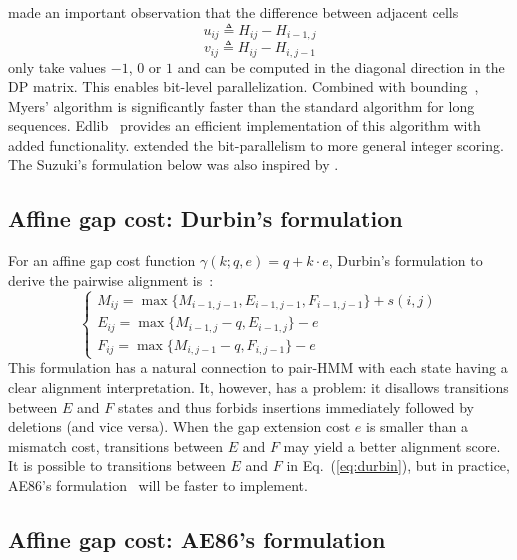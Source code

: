 \documentclass{bioinfo}
\begin{document}
\citet{Myers:1999aa} made an important observation that the difference between
adjacent cells
\[u_{ij}\triangleq H_{ij}-H_{i-1,j}\]
\[v_{ij}\triangleq H_{ij}-H_{i,j-1}\]
only take values $-1$, $0$ or $1$ and can be computed in the diagonal direction
in the DP matrix. This enables bit-level parallelization. Combined with
bounding~\citep{Ukkonen:1985aa}, Myers' algorithm is significantly faster than
the standard algorithm for long sequences. Edlib~\citep{Sosic:2017aa} provides
an efficient implementation of this algorithm with added functionality.
\citet{Loving:2014aa} extended the bit-parallelism to more general integer
scoring. The Suzuki's formulation below was also inspired by
\citet{Myers:1999aa}.

\subsection{Affine gap cost: Durbin's formulation}

For an affine gap cost function $\gamma(k;q,e)=q+k\cdot e$, Durbin's formulation
to derive the pairwise alignment is~\citep{Durbin:1998uq}:
\begin{equation}\label{eq:durbin}
\left\{\begin{array}{l}
M_{ij}=\max\{M_{i-1,j-1}, E_{i-1,j-1}, F_{i-1,j-1}\} + s(i,j)\\
E_{ij}=\max\{M_{i-1,j}-q, E_{i-1,j}\} - e\\
F_{ij}=\max\{M_{i,j-1}-q, F_{i,j-1}\} - e
\end{array}\right.
\end{equation}
This formulation has a natural connection to pair-HMM with each state having a
clear alignment interpretation. It, however, has a problem: it disallows
transitions between $E$ and $F$ states and thus forbids insertions immediately
followed by deletions (and vice versa). When the gap extension cost $e$ is
smaller than a mismatch cost, transitions between $E$ and $F$ may yield a
better alignment score. It is possible to transitions between $E$ and $F$ in
Eq.~(\ref{eq:durbin}), but in practice, AE86's
formulation~\citep{Altschul:1986aa} will be faster to implement.

\subsection{Affine gap cost: AE86's formulation}
\end{document}
